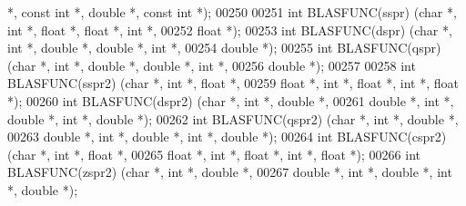 \begin{DoxyCode}
      *, \textcolor{keyword}{const} \textcolor{keywordtype}{int} *, \textcolor{keywordtype}{double} *, \textcolor{keyword}{const} \textcolor{keywordtype}{int} *);
00250 
00251 \textcolor{keywordtype}{int} BLASFUNC(sspr) (\textcolor{keywordtype}{char} *, \textcolor{keywordtype}{int} *, \textcolor{keywordtype}{float}   *, \textcolor{keywordtype}{float}  *, \textcolor{keywordtype}{int} *,
00252             \textcolor{keywordtype}{float}  *);
00253 \textcolor{keywordtype}{int} BLASFUNC(dspr) (\textcolor{keywordtype}{char} *, \textcolor{keywordtype}{int} *, \textcolor{keywordtype}{double}  *, \textcolor{keywordtype}{double} *, \textcolor{keywordtype}{int} *,
00254             \textcolor{keywordtype}{double} *);
00255 \textcolor{keywordtype}{int} BLASFUNC(qspr) (\textcolor{keywordtype}{char} *, \textcolor{keywordtype}{int} *, \textcolor{keywordtype}{double}  *, \textcolor{keywordtype}{double} *, \textcolor{keywordtype}{int} *,
00256             \textcolor{keywordtype}{double} *);
00257 
00258 \textcolor{keywordtype}{int} BLASFUNC(sspr2) (\textcolor{keywordtype}{char} *, \textcolor{keywordtype}{int} *, \textcolor{keywordtype}{float}   *,
00259              \textcolor{keywordtype}{float}  *, \textcolor{keywordtype}{int} *, \textcolor{keywordtype}{float}  *, \textcolor{keywordtype}{int} *, \textcolor{keywordtype}{float}  *);
00260 \textcolor{keywordtype}{int} BLASFUNC(dspr2) (\textcolor{keywordtype}{char} *, \textcolor{keywordtype}{int} *, \textcolor{keywordtype}{double}  *,
00261              \textcolor{keywordtype}{double} *, \textcolor{keywordtype}{int} *, \textcolor{keywordtype}{double} *, \textcolor{keywordtype}{int} *, \textcolor{keywordtype}{double} *);
00262 \textcolor{keywordtype}{int} BLASFUNC(qspr2) (\textcolor{keywordtype}{char} *, \textcolor{keywordtype}{int} *, \textcolor{keywordtype}{double}  *,
00263              \textcolor{keywordtype}{double} *, \textcolor{keywordtype}{int} *, \textcolor{keywordtype}{double} *, \textcolor{keywordtype}{int} *, \textcolor{keywordtype}{double} *);
00264 \textcolor{keywordtype}{int} BLASFUNC(cspr2) (\textcolor{keywordtype}{char} *, \textcolor{keywordtype}{int} *, \textcolor{keywordtype}{float}   *,
00265              \textcolor{keywordtype}{float}  *, \textcolor{keywordtype}{int} *, \textcolor{keywordtype}{float}  *, \textcolor{keywordtype}{int} *, \textcolor{keywordtype}{float}  *);
00266 \textcolor{keywordtype}{int} BLASFUNC(zspr2) (\textcolor{keywordtype}{char} *, \textcolor{keywordtype}{int} *, \textcolor{keywordtype}{double}  *,
00267              \textcolor{keywordtype}{double} *, \textcolor{keywordtype}{int} *, \textcolor{keywordtype}{double} *, \textcolor{keywordtype}{int} *, \textcolor{keywordtype}{double} *);

\end{DoxyCode}
